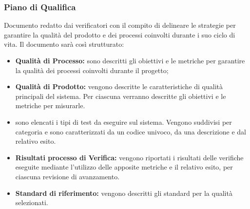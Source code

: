 \subsubsection{Piano di Qualifica}
Documento redatto dai verificatori con il compito di delineare le strategie per garantire la qualità del prodotto e dei processi coinvolti durante i suo ciclo di vita. Il documento sarà così strutturato:
\begin{itemize}
  \item \textbf{Qualità di Processo:} sono descritti gli obiettivi e le metriche per garantire la qualità dei processi coinvolti durante il progetto;
  \item \textbf{Qualità di Prodotto:} vengono descritte le caratteristiche di qualità principali del sistema. Per ciascuna verranno descritte gli obiettivi e le metriche per misurarle.
  \item {} sono elencati i tipi di test da eseguire sul sistema. Vengono suddivisi per categoria e sono caratterizzati da un codice univoco, da una descrizione e dal relativo esito.
  \item \textbf{Risultati processo di Verifica:} vengono riportati i risultati delle verifiche eseguite mediante l'utilizzo delle apposite metriche e il relativo esito, per ciascuna revisione di avanzamento.
  \item \textbf{Standard di riferimento:} vengono descritti gli standard per la qualità selezionati.
\end{itemize}
